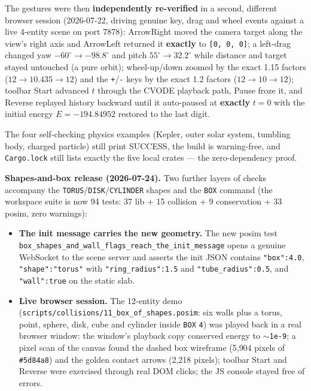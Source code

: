 \documentclass[11pt]{article}
\newcommand{\kw}[1]{\texttt{\uppercase{#1}}}
\newcommand{\code}[1]{\texttt{#1}}
\begin{document}
The gestures were then \textbf{independently re-verified} in a
second, different browser session (2026-07-22, driving genuine key,
drag and wheel events against a live 4-entity scene on port 7878):
ArrowRight moved the camera target along the view's right axis and
ArrowLeft returned it \textbf{exactly} to \code{[0, 0, 0]}; a
left-drag changed yaw $-60^\circ \to -98.8^\circ$ and pitch
$55^\circ \to 32.2^\circ$ while distance and target stayed untouched
(a pure orbit); wheel-up/down zoomed by the exact 1.15 factors
($12 \to 10.435 \to 12$) and the \code{+}/\code{-} keys by the exact
1.2 factors ($12 \to 10 \to 12$); toolbar Start advanced $t$ through
the CVODE playback path, Pause froze it, and Reverse replayed history
backward until it auto-paused at \textbf{exactly} $t = 0$ with the
initial energy $E = -194.84952$ restored to the last digit.

The four self-checking physics examples (Kepler, outer solar system,
tumbling body, charged particle) still print SUCCESS, the build is
warning-free, and \code{Cargo.lock} still lists exactly the five
local crates --- the zero-dependency proof.

\textbf{Shapes-and-box release (2026-07-24).} Two further layers of
checks accompany the \kw{torus}/\kw{disk}/\kw{cylinder} shapes and
the \kw{box} command (the workspace suite is now 94 tests: 37 lib +
15 collision + 9 conservation + 33 posim, zero warnings):

\begin{itemize}
\item \textbf{The init message carries the new geometry.} The new
      posim test
      \code{box\_shapes\_and\_wall\_flags\_reach\_the\_init\_message}
      opens a genuine WebSocket to the scene server and asserts the
      init JSON contains \code{"box":4.0}, \code{"shape":"torus"}
      with \code{"ring\_radius":1.5} and \code{"tube\_radius":0.5},
      and \code{"wall":true} on the static slab.
\item \textbf{Live browser session.} The 12-entity demo
      (\code{scripts/collisions/11\_box\_of\_shapes.posim}: six walls
      plus a torus, point, sphere, disk, cube and cylinder inside
      \kw{box} \code{4}) was played back in a real browser window:
      the window's playback copy conserved energy to
      $\sim$\code{1e-9}; a pixel scan of the canvas found the dashed
      box wireframe (5{,}904 pixels of \code{\#5d84a8}) and the
      golden contact arrows (2{,}218 pixels); toolbar Start and
      Reverse were exercised through real DOM clicks; the JS console
      stayed free of errors.
\end{itemize}
\end{document}
